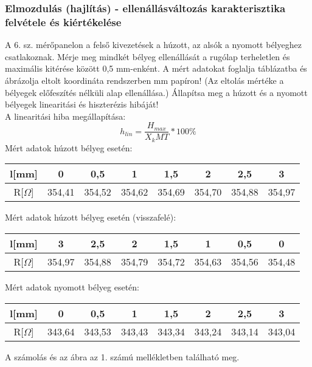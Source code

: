 \documentclass[10pt,a4paper]{article}
\begin{document}
		\subsubsection{Elmozdulás (hajlítás) - ellenállásváltozás karakterisztika felvétele és kiértékelése}
		A 6. sz. mérőpanelon a felső kivezetések a húzott, az alsók a nyomott bélyeghez csatlakoznak.
Mérje meg mindkét bélyeg ellenállását a rugólap terheletlen és maximális kitérése között 0,5
mm-enként. A mért adatokat foglalja táblázatba és ábrázolja eltolt koordináta rendszerben mm papíron! (Az eltolás mértéke a bélyegek előfeszítés nélküli alap ellenállása.)
Állapítsa meg a húzott és a nyomott bélyegek linearitási és hiszterézis hibáját!$$$$A linearitási hiba megállapítása:$$h_{lin}=\frac{H_{max}}{X_kMT}*100 \%$$Mért adatok húzott bélyeg esetén:$$$$\begin{tabular}{|c|c|c|c|c|c|c|c|}
\hline 
l[mm] & 0 & 0,5 & 1 & 1,5 & 2 & 2,5 & 3 \\ 
\hline 
R[$\Omega$] & 354,41 & 354,52 & 354,62 & 354,69 & 354,70 & 354,88 & 354,97 \\ 
\hline 
\end{tabular} $$$$
Mért adatok húzott bélyeg esetén (visszafelé):$$$$\begin{tabular}{|c|c|c|c|c|c|c|c|}
\hline 
l[mm] & 3 & 2,5 & 2 & 1,5 & 1 & 0,5 & 0 \\ 
\hline 
R[$\Omega$] & 354,97 & 354,88 & 354,79 & 354,72 & 354,63 & 354,56 & 354,48 \\ 
\hline 
\end{tabular}$$$$
Mért adatok nyomott bélyeg esetén:$$$$\begin{tabular}{|c|c|c|c|c|c|c|c|}
\hline 
l[mm] & 0 & 0,5 & 1 & 1,5 & 2 & 2,5 & 3 \\ 
\hline 
R[$\Omega$] & 343,64 & 343,53 & 343,43 & 343,34 & 343,24 & 343,14 & 343,04 \\ 
\hline 
\end{tabular} $$$$ A számolás és az ábra az 1. számú mellékletben található meg.
\end{document}
